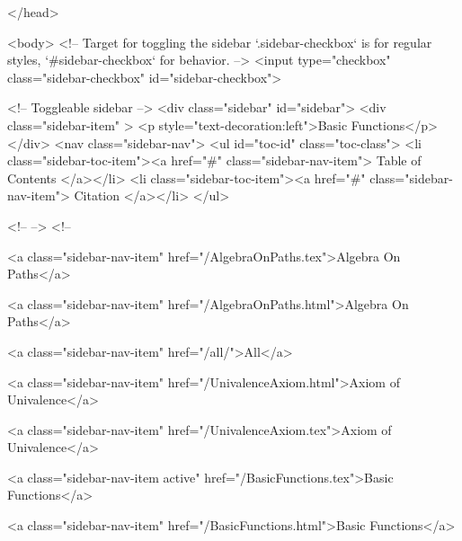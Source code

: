   
</head>




  <body>
    <!-- Target for toggling the sidebar `.sidebar-checkbox` is for regular
     styles, `#sidebar-checkbox` for behavior. -->
<input type="checkbox" class="sidebar-checkbox" id="sidebar-checkbox">

<!-- Toggleable sidebar -->
<div class="sidebar" id="sidebar">
  <div class="sidebar-item" >
    <p style="text-decoration:left">Basic Functions</p>
  </div>
  <nav class="sidebar-nav">
    <ul id="toc-id" class="toc-class">
  <li class="sidebar-toc-item"><a href="#" class="sidebar-nav-item"> Table of Contents </a></li>
  <li class="sidebar-toc-item"><a href="#" class="sidebar-nav-item"> Citation </a></li>
</ul>


    <!--  -->
    <!-- 
      
    
      
    
      
    
      
        
      
    
      
        
          <a class="sidebar-nav-item" href="/AlgebraOnPaths.tex">Algebra On Paths</a>
        
      
    
      
        
          <a class="sidebar-nav-item" href="/AlgebraOnPaths.html">Algebra On Paths</a>
        
      
    
      
        
          <a class="sidebar-nav-item" href="/all/">All</a>
        
      
    
      
        
          <a class="sidebar-nav-item" href="/UnivalenceAxiom.html">Axiom of Univalence</a>
        
      
    
      
        
          <a class="sidebar-nav-item" href="/UnivalenceAxiom.tex">Axiom of Univalence</a>
        
      
    
      
        
          <a class="sidebar-nav-item active" href="/BasicFunctions.tex">Basic Functions</a>
        
      
    
      
        
          <a class="sidebar-nav-item" href="/BasicFunctions.html">Basic Functions</a>
        
